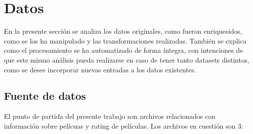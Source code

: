 \documentclass[journal]{IEEEtran}
\begin{document}
\section{Datos}
En la presente sección se analiza los datos originales, como fueron enriquesidos,
como se los ha manipulado y las transformaciones realizadas. También se explica como 
el procesamiento se ha automatizado 
de forma íntegra, con intenciones de que este mismo análisis 
pueda realizarse en caso de tener tanto datasets distintos, como se desee incorporar
nuevas entradas a los datos existentes.

\subsection{Fuente de datos}
El punto de partida del presente trabajo son  archivos relacionados con información
sobre pelícuas y rating de películas. Los archivos en cuestión son 3:
\end{document}
